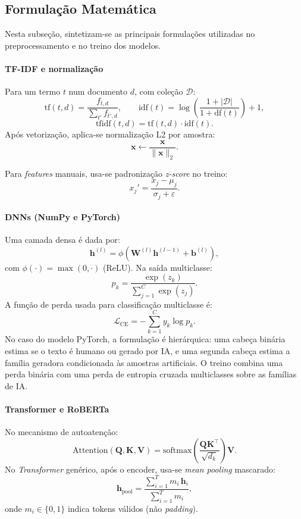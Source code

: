 \documentclass[runningheads]{llncs}
\begin{document}
\subsection{Formulação Matemática}

Nesta subseção, sintetizam-se as principais formulações utilizadas no preprocessamento e no treino dos modelos.

\paragraph{TF-IDF e normalização}
Para um termo \(t\) num documento \(d\), com coleção \(\mathcal{D}\):
\[
\mathrm{tf}(t,d)=\frac{f_{t,d}}{\sum_{t'} f_{t',d}},
\qquad
\mathrm{idf}(t)=\log\left(\frac{1+|\mathcal{D}|}{1+\mathrm{df}(t)}\right)+1,
\]
\[
\mathrm{tfidf}(t,d)=\mathrm{tf}(t,d)\cdot\mathrm{idf}(t).
\]
Após vetorização, aplica-se normalização L2 por amostra:
\[
\mathbf{x}\leftarrow\frac{\mathbf{x}}{\lVert \mathbf{x} \rVert_2}.
\]

Para \textit{features} manuais, usa-se padronização \textit{z-score} no treino:
\[
x_j' = \frac{x_j-\mu_j}{\sigma_j+\varepsilon}.
\]

\paragraph{DNNs (NumPy e PyTorch)}
Uma camada densa é dada por:
\[
\mathbf{h}^{(l)} = \phi\!\left(\mathbf{W}^{(l)}\mathbf{h}^{(l-1)} + \mathbf{b}^{(l)}\right),
\]
com \(\phi(\cdot)=\max(0,\cdot)\) (ReLU). Na saída multiclasse:
\[
p_k = \frac{\exp(z_k)}{\sum_{j=1}^{C}\exp(z_j)}.
\]
A função de perda usada para classificação multiclasse é:
\[
\mathcal{L}_{\mathrm{CE}} = -\sum_{k=1}^{C} y_k\log p_k.
\]
No caso do modelo PyTorch, a formulação é hierárquica: uma cabeça binária estima se o texto é humano ou gerado por IA, e uma segunda cabeça estima a família geradora condicionada às amostras artificiais. O treino combina uma perda binária com uma perda de entropia cruzada multiclasses sobre as famílias de IA.

\paragraph{Transformer e RoBERTa}
No mecanismo de autoatenção:
\[
\mathrm{Attention}(\mathbf{Q},\mathbf{K},\mathbf{V})=
\mathrm{softmax}\!\left(\frac{\mathbf{Q}\mathbf{K}^{\top}}{\sqrt{d_k}}\right)\mathbf{V}.
\]
No \textit{Transformer} genérico, após o encoder, usa-se \textit{mean pooling} mascarado:
\[
\mathbf{h}_{\mathrm{pool}}=
\frac{\sum_{i=1}^{T} m_i\,\mathbf{h}_i}{\sum_{i=1}^{T} m_i},
\]
onde \(m_i\in\{0,1\}\) indica tokens válidos (não \textit{padding}).
\end{document}
